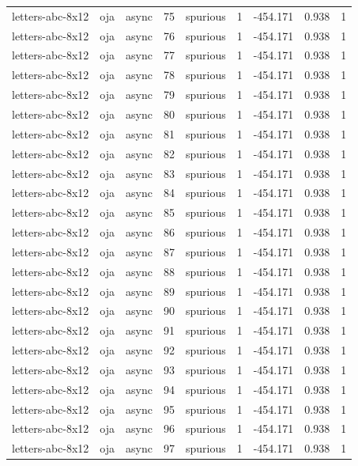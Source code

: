 \begin{tabular}{lllrlrrrr}
letters-abc-8x12 & oja & async & 75 & spurious & 1 & -454.171 & 0.938 & 1 \\
letters-abc-8x12 & oja & async & 76 & spurious & 1 & -454.171 & 0.938 & 1 \\
letters-abc-8x12 & oja & async & 77 & spurious & 1 & -454.171 & 0.938 & 1 \\
letters-abc-8x12 & oja & async & 78 & spurious & 1 & -454.171 & 0.938 & 1 \\
letters-abc-8x12 & oja & async & 79 & spurious & 1 & -454.171 & 0.938 & 1 \\
letters-abc-8x12 & oja & async & 80 & spurious & 1 & -454.171 & 0.938 & 1 \\
letters-abc-8x12 & oja & async & 81 & spurious & 1 & -454.171 & 0.938 & 1 \\
letters-abc-8x12 & oja & async & 82 & spurious & 1 & -454.171 & 0.938 & 1 \\
letters-abc-8x12 & oja & async & 83 & spurious & 1 & -454.171 & 0.938 & 1 \\
letters-abc-8x12 & oja & async & 84 & spurious & 1 & -454.171 & 0.938 & 1 \\
letters-abc-8x12 & oja & async & 85 & spurious & 1 & -454.171 & 0.938 & 1 \\
letters-abc-8x12 & oja & async & 86 & spurious & 1 & -454.171 & 0.938 & 1 \\
letters-abc-8x12 & oja & async & 87 & spurious & 1 & -454.171 & 0.938 & 1 \\
letters-abc-8x12 & oja & async & 88 & spurious & 1 & -454.171 & 0.938 & 1 \\
letters-abc-8x12 & oja & async & 89 & spurious & 1 & -454.171 & 0.938 & 1 \\
letters-abc-8x12 & oja & async & 90 & spurious & 1 & -454.171 & 0.938 & 1 \\
letters-abc-8x12 & oja & async & 91 & spurious & 1 & -454.171 & 0.938 & 1 \\
letters-abc-8x12 & oja & async & 92 & spurious & 1 & -454.171 & 0.938 & 1 \\
letters-abc-8x12 & oja & async & 93 & spurious & 1 & -454.171 & 0.938 & 1 \\
letters-abc-8x12 & oja & async & 94 & spurious & 1 & -454.171 & 0.938 & 1 \\
letters-abc-8x12 & oja & async & 95 & spurious & 1 & -454.171 & 0.938 & 1 \\
letters-abc-8x12 & oja & async & 96 & spurious & 1 & -454.171 & 0.938 & 1 \\
letters-abc-8x12 & oja & async & 97 & spurious & 1 & -454.171 & 0.938 & 1 \\

\end{tabular}
